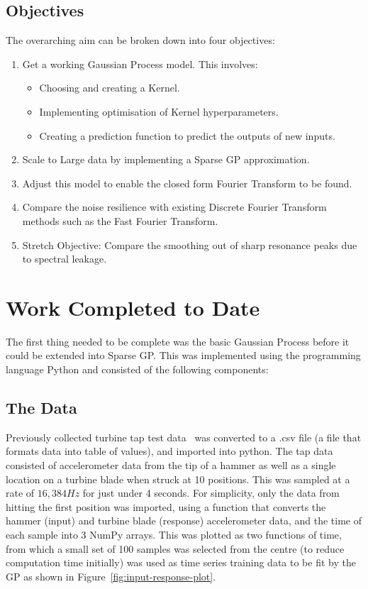 \documentclass[12pt]{article}
\begin{document}
    \subsection{Objectives}
    The overarching aim can be broken down into four objectives:
        \begin{enumerate}
            \item Get a working Gaussian Process model.
            This involves:
                \begin{itemize}
                    \item Choosing and creating a Kernel.
                    \item Implementing optimisation of Kernel hyperparameters. \label{item:nll}
                    \item Creating a prediction function to predict the outputs of new inputs. \label{item:predict}
                \end{itemize}
            \item Scale to Large data by implementing a Sparse GP approximation.
            \item Adjust this model to enable the closed form Fourier Transform to be found.
            \item Compare the noise resilience with existing Discrete Fourier Transform methods such as the Fast Fourier Transform.\label{noise-resiliance}
            \item Stretch Objective: Compare the smoothing out of sharp resonance peaks due to spectral leakage.\label{stretch-obj}
        \end{enumerate}

    \section{Work Completed to Date}
    The first thing needed to be complete was the basic Gaussian Process before it could be extended into Sparse GP\@.
    This was implemented using the programming language Python and consisted of the following components:
    \subsection{The Data}
    Previously collected turbine tap test data~\cite{MEC326} was converted to a .csv file (a file that formats data into table of values), and imported into python.
    The tap data consisted of accelerometer data from the tip of a hammer as well as a single location on a turbine blade when struck at 10 positions.
    This was sampled at a rate of $16,384 Hz$ for just under 4 seconds.
    For simplicity, only the data from hitting the first position was imported, using a function that converts the hammer (input) and turbine blade (response) accelerometer data, and the time of each sample into 3 NumPy arrays.
    This was plotted as two functions of time, from which a small set of 100 samples was selected from the centre (to reduce computation time initially) was used as time series training data to be fit by the GP as shown in Figure~\ref{fig:input-response-plot}.
\end{document}
